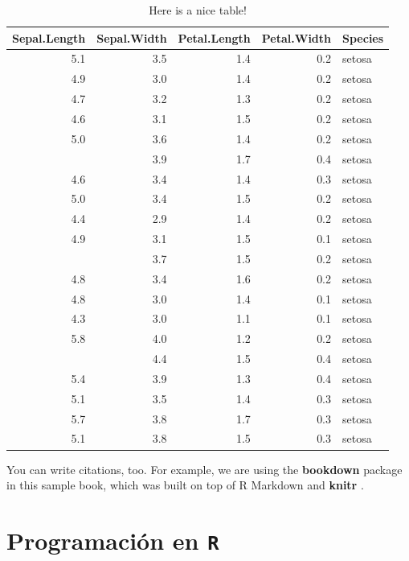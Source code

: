 \documentclass[
]{book}
\begin{document}
\begin{table}

\caption{\label{tab:nice-tab}Here is a nice table!}
\centering
\begin{tabular}[t]{rrrrl}
\toprule
Sepal.Length & Sepal.Width & Petal.Length & Petal.Width & Species\\
\midrule
5.1 & 3.5 & 1.4 & 0.2 & setosa\\
4.9 & 3.0 & 1.4 & 0.2 & setosa\\
4.7 & 3.2 & 1.3 & 0.2 & setosa\\
4.6 & 3.1 & 1.5 & 0.2 & setosa\\
5.0 & 3.6 & 1.4 & 0.2 & setosa\\
\addlinespace
5.4 & 3.9 & 1.7 & 0.4 & setosa\\
4.6 & 3.4 & 1.4 & 0.3 & setosa\\
5.0 & 3.4 & 1.5 & 0.2 & setosa\\
4.4 & 2.9 & 1.4 & 0.2 & setosa\\
4.9 & 3.1 & 1.5 & 0.1 & setosa\\
\addlinespace
5.4 & 3.7 & 1.5 & 0.2 & setosa\\
4.8 & 3.4 & 1.6 & 0.2 & setosa\\
4.8 & 3.0 & 1.4 & 0.1 & setosa\\
4.3 & 3.0 & 1.1 & 0.1 & setosa\\
5.8 & 4.0 & 1.2 & 0.2 & setosa\\
\addlinespace
5.7 & 4.4 & 1.5 & 0.4 & setosa\\
5.4 & 3.9 & 1.3 & 0.4 & setosa\\
5.1 & 3.5 & 1.4 & 0.3 & setosa\\
5.7 & 3.8 & 1.7 & 0.3 & setosa\\
5.1 & 3.8 & 1.5 & 0.3 & setosa\\
\bottomrule
\end{tabular}
\end{table}

You can write citations, too. For example, we are using the \textbf{bookdown} package \citep{R-bookdown} in this sample book, which was built on top of R Markdown and \textbf{knitr} \citep{xie2015}.

\hypertarget{appendix-apuxe9ndice}{%
\appendix}


\hypertarget{programaciuxf3n-en-r}{%
\chapter{\texorpdfstring{Programación en \texttt{R}}{Programación en R}}\label{programaciuxf3n-en-r}}
\end{document}
